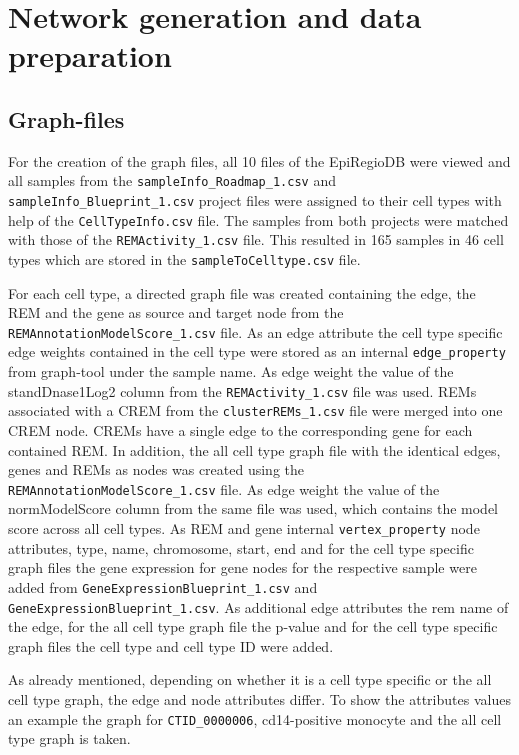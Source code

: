 \documentclass[pdftex,12pt,a4paper]{report}
\begin{document}
\section{Network generation and data preparation}
\subsection{Graph-files}
\label{graphfiles}
For the creation of the graph files, all 10 files of the EpiRegioDB were viewed and all samples from the \texttt{sampleInfo\_Roadmap\_1.csv} and \texttt{sampleInfo\_Blueprint\_1.csv} project files were assigned to their cell types with help of the \texttt{CellTypeInfo.csv} file. The samples from both projects were matched with those of the \texttt{REMActivity\_1.csv} file. This resulted in 165 samples in 46 cell types which are stored in the \texttt{sampleToCelltype.csv} file. 

For each cell type, a directed graph file was created containing the edge, the REM and the gene as source and target node from the \texttt{REMAnnotationModelScore\_1.csv} file. As an edge attribute the cell type specific edge weights contained in the cell type were stored as an internal \texttt{edge\_property} from graph-tool under the sample name. As edge weight the value of the standDnase1Log2 column from the \texttt{REMActivity\_1.csv} file was used. REMs associated with a CREM from the \texttt{clusterREMs\_1.csv} file were merged into one CREM node. CREMs have a single edge to the corresponding gene for each contained REM. 
In addition, the all cell type graph file with the identical edges, genes and REMs as nodes was created using the \texttt{REMAnnotationModelScore\_1.csv} file. As edge weight the value of the normModelScore column from the same file was used, which contains the model score across all cell types.
As REM and gene internal \texttt{vertex\_property} node attributes, type, name, chromosome, start, end and for the cell type specific graph files the gene expression for gene nodes for the respective sample were added from \texttt{GeneExpressionBlueprint\_1.csv} and \texttt{GeneExpressionBlueprint\_1.csv}.
As additional edge attributes the rem name of the edge, for the all cell type graph file the p-value and for the cell type specific graph files the cell type and cell type ID were added. 

As already mentioned, depending on whether it is a cell type specific or the all cell type graph, the edge and node attributes differ. To show the attributes values an example the graph for \texttt{CTID\_0000006}, cd14-positive monocyte and the all cell type graph is taken. 
\end{document}
